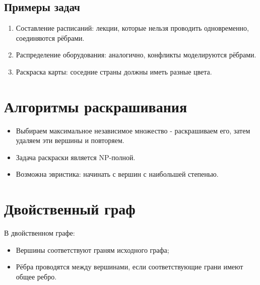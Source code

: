 {\subsection*{Примеры задач}

\begin{enumerate}
  \item Составление расписаний: лекции, которые нельзя проводить одновременно, соединяются рёбрами.
  \item Распределение оборудования: аналогично, конфликты моделируются рёбрами.
  \item Раскраска карты: соседние страны должны иметь разные цвета.
\end{enumerate}

\section*{Алгоритмы раскрашивания}

\begin{itemize}
  \item Выбираем максимальное независимое множество - раскрашиваем его, затем удаляем эти вершины и повторяем.
  \item Задача раскраски является NP-полной.
  \item Возможна эвристика: начинать с вершин с наибольшей степенью.
\end{itemize}

\section*{Двойственный граф}

В двойственном графе:
\begin{itemize}
  \item Вершины соответствуют граням исходного графа;
  \item Рёбра проводятся между вершинами, если соответствующие грани имеют общее ребро.
\end{itemize}



    \newpage
}
